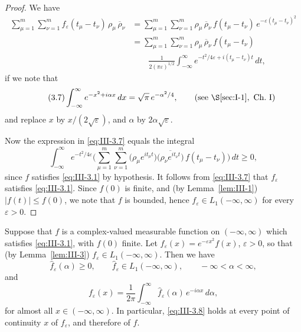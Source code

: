 \begin{proof}
We have
\begin{align*}
\sum_{\mu=1}^{m}\sum_{\nu=1}^{m}f_{\varepsilon}(t_{\mu}-t_{\nu})\,\rho_{\mu}\,\overline{\rho}_{\nu}
&=\sum_{\mu=1}^{m}\sum_{\nu=1}^{m}\rho_{\mu}\,\overline{\rho}_{\nu}\,f(t_{\mu}-t_{\nu})\,e^{-\varepsilon(t_{\mu}-t_{\nu})^{2}}\\
&=\sum_{\mu=1}^{m}\sum_{\nu=1}^{m}\rho_{\mu}\,\overline{\rho}_{\nu}\,f(t_{\mu}-t_{\nu})\,\\
&\qquad\frac{1}{2(\pi\varepsilon)^{1/2}}\int_{-\infty}^{\infty}e^{-t^{2}/4\varepsilon+i(t_{\mu}-t_{\nu})t}\,dt,
\end{align*}
if we note that
\begin{equation}\tag{3.7}\label{eq:III-3.7}
\int_{-\infty}^{\infty}e^{-x^{2}+i\alpha x}\,dx=\sqrt{\pi}\,e^{-\alpha^{2}/4},\qquad(\text{see }\S\ref{sec:I-1},\text{ Ch.~I})
\end{equation}
and replace $x$ by $x/(2\sqrt{\varepsilon})$, and $\alpha$ by $2\alpha\sqrt{\varepsilon}$.

Now the expression in \eqref{eq:III-3.7} equals the integral
\[
\int_{-\infty}^{\infty}e^{-t^{2}/4\varepsilon}
\Biggl(\sum_{\mu=1}^{m}\sum_{\nu=1}^{m}
\bigl(\rho_{\mu}e^{it_{\mu}t}\bigr)\overline{\bigl(\rho_{\nu}e^{it_{\nu}t}\bigr)}\,f(t_{\mu}-t_{\nu})\Biggr)\,dt\ge0,
\]
since $f$ satisfies \eqref{eq:III-3.1} by hypothesis. It follows from \eqref{eq:III-3.7} that $f_{\varepsilon}$ satisfies \eqref{eq:III-3.1}. Since $f(0)$ is finite, and (by Lemma~\ref{lem:III-1}) $|f(t)|\le f(0)$, we note that $f$ is bounded, hence $f_{\varepsilon}\in L_{1}(-\infty,\infty)$ for every $\varepsilon>0$.
\end{proof}

\begin{lemma}\label{lem:III-4}
Suppose that $f$ is a complex-valued measurable function on $(-\infty,\infty)$ which satisfies \eqref{eq:III-3.1}, with $f(0)$ finite. Let $f_{\varepsilon}(x)=e^{-\varepsilon x^{2}}f(x)$, $\varepsilon>0$, so that (by Lemma~\ref{lem:III-3}) $f_{\varepsilon}\in L_{1}(-\infty,\infty)$. Then we have
\[
\hat f_{\varepsilon}(\alpha)\ge0,\qquad \hat f_{\varepsilon}\in L_{1}(-\infty,\infty),\qquad-\infty<\alpha<\infty,
\]
and
\begin{equation}\tag{3.8}\label{eq:III-3.8}
f_{\varepsilon}(x)=\frac{1}{2\pi}\int_{-\infty}^{\infty}\hat f_{\varepsilon}(\alpha)\,e^{-i\alpha x}\,d\alpha,
\end{equation}
for almost all $x\in(-\infty,\infty)$. In particular, \eqref{eq:III-3.8} holds at every point of continuity $x$ of $f_{\varepsilon}$, and therefore of $f$.
\end{lemma}

